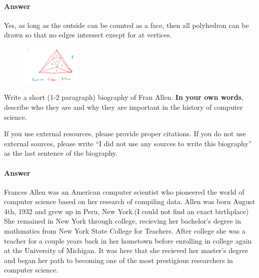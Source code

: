 \documentclass{article}
\begin{document}
\begin{enumerate}
        \paragraph{Answer}

		Yes, as long as the outside can be counted as a face, then all polyhedron can be drawn so that no edges intersect execpt for at vertices.

        \begin{figure}[h]
		\centering
			\includegraphics[width=0.25\textwidth]{HW_5_3-3}
		\end{figure}


\end{enumerate}


Write a short (1-2 paragraph) biography of Fran Allen.
\textbf{In your own words}, describe who they are and why they are important in
the history of computer science.

If you use external resources, please provide
proper citations. If you do not use external sources, please write ``I did not
use any sources to write this biography'' as the last sentence of the
biography.

\paragraph{Answer}

Frances Allen was an American computer scientist who pioneered the world of computer science based on her research of compiling data. Allen was born August 4th, 1932 and grew up in Peru, New York.(I could not find an exact birthplace) She remained in New York through college, recieving her bachelor's degree in mathmatics from New York State College for Teachers. After college she was a teacher for a couple years back in her hometown before enrolling in college again at the University of Michigan. It was here that she recieved her master's degree and began her path to becoming one of the most prestigious researchers in computer science. 
\end{document}
